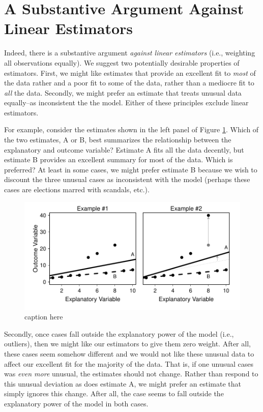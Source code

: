\documentclass[12pt]{article}
\begin{document}
\section*{A Substantive Argument Against Linear Estimators}

Indeed, there is a substantive argument \textit{against linear estimators} (i.e., weighting all observations equally). We suggest two potentially desirable properties of estimators. First, we might like estimates that provide an excellent fit to \textit{most} of the data rather and a poor fit to some of the data, rather than a mediocre fit to \textit{all} the data. Secondly, we might prefer an estimate that treats unusual data equally--as inconsistent the the model. Either of these principles exclude linear estimators.

For example, consider the estimates shown in the left panel of Figure \ref{fig:best-fit-illustration}. Which of the two estimates, A or B, best summarizes the relationship between the explanatory and outcome variable? Estimate A fits all the data decently, but estimate B provides an excellent summary for most of the data. Which is preferred? At least in some cases, we might prefer estimate B because we wish to discount the three unusual cases as inconsistent with the model (perhaps these cases are elections marred with scandals, etc.).

\begin{figure}[H]
\begin{center}
\includegraphics[scale = .7]{figs/best-fit-illustration.pdf}
\caption{caption here}\label{fig:best-fit-illustration}
\end{center}
\end{figure}

Secondly, once cases fall outside the explanatory power of the model (i.e., outliers), then we might like our estimators to give them zero weight. After all, these cases seem somehow different and we would not like these unusual data to affect our excellent fit for the majority of the data. That is, if one unusual cases was \textit{even more} unusual, the estimates should not change. Rather than respond to this unusual deviation as does estimate A, we might prefer an estimate that simply ignores this change. After all, the case seems to fall outside the explanatory power of the model in both cases.
\end{document}
